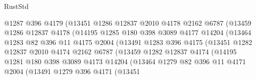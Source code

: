 \begin{lexlean}{RustStd}
\begin{coremodule}
{\begin{coremodule}
{{{{{{{{{{{{{{{{{{{{{{{{{{{{{{{                          @1287
                          @396
                          @4179
                          (@13451
                            @1286
                            @12837
                            @2010
                            @4178
                            @2162
                            @6787
                            (@13459
                              @1286
                              @12837
                              @4178
                              (@14195
                                @1285
                                @180
                                @398
                                @3089
                                @4177
                                @14204
                                (@13464
                                  @1283
                                  @82
                                  @396
                                  @11
                                  @4175
                                  @2004
                                  (@13491
                                    @1283
                                    @396
                                    @4175
                                    (@13451
                                      @1282
                                      @12837
                                      @2010
                                      @4174
                                      @2162
                                      @6787
                                      (@13459
                                        @1282
                                        @12837
                                        @4174
                                        (@14195
                                          @1281
                                          @180
                                          @398
                                          @3089
                                          @4173
                                          @14204
                                          (@13464
                                            @1279
                                            @82
                                            @396
                                            @11
                                            @4171
                                            @2004
                                            (@13491
                                              @1279
                                              @396
                                              @4171
                                              (@13451
}}}}}}}}}}}}}}}}}}}}}}}}}}}}}}}
\end{coremodule}}
\end{coremodule}
\end{lexlean}
